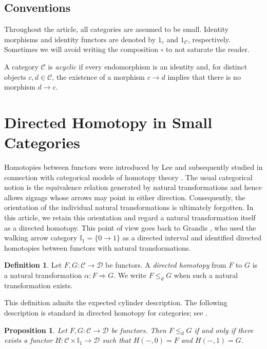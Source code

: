 \documentclass[12pt]{amsart}
\newtheorem{prop}[teo]{Proposition}
\theoremstyle{definition}
\newtheorem{definition}[teo]{Definition}
\theoremstyle{remark}
\numberwithin{figure}{section}%
\newcommand{\CC}{\mathcal{C}}
\newcommand{\Dc}{\mathcal{D}}
\begin{document}
\subsection*{Conventions}

Throughout the article, all categories are assumed to be small. Identity
morphisms and identity functors are denoted by \(1_c\) and \(1_\CC\),
respectively. Sometimes we will avoid writing the composition \(\circ\) to not saturate the reader.

A category \(\CC\) is \emph{acyclic} \cite[chapter 10]{Kozlov} if every endomorphism is an identity
and, for distinct objects \(c,d\in\CC\), the existence of a morphism
\(c\to d\) implies that there is no morphism \(d\to c\).

\section{Directed Homotopy in Small Categories}\label{section:Directed_Homotpy}

Homotopies between functors were introduced by Lee
\cite{LEEHomotopy} and subsequently studied in connection with categorical
models of homotopy theory \cite{Cat_Miniam}. The usual categorical notion
is the equivalence relation generated by natural transformations and hence
allows zigzags whose arrows may point in either direction. Consequently,
the orientation of the individual natural transformations is ultimately
forgotten. In this article, we retain this orientation and regard a natural
transformation itself as a directed homotopy. This point of view goes back
to Grandis \cite{GrandisShape}, who used the walking arrow category
\(\mathbb{I}_1=\{0\to1\}\) as a directed interval and identified directed
homotopies between functors with natural transformations.

\begin{definition}
Let \(F,G\colon\CC\to\Dc\) be functors. A \emph{directed homotopy} from
\(F\) to \(G\) is a natural transformation \(\alpha\colon F\Rightarrow G\).
We write \(F\leq_d G\) when such a natural transformation exists.
\end{definition}

This definition admits the expected cylinder description.  The following description is standard in directed
homotopy for categories; see \cite[Section~1.5]{GrandisShape}.

\begin{prop}\label{prop:directed_homotopy_cylinder}
Let \(F,G\colon\CC\to\Dc\) be functors. Then \(F\leq_d G\) if and only if
there exists a functor \(H\colon\CC\times\mathbb{I}_1\to\Dc\) such that
\(H(-,0)=F\) and \(H(-,1)=G\).
\end{prop}
\end{document}
